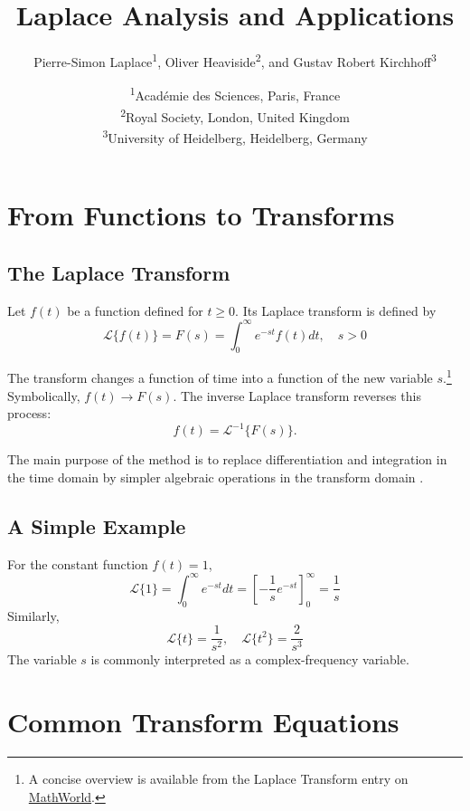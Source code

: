 \documentclass[11pt,a4paper]{article}
\title{Laplace Analysis and Applications}
\author{
    Pierre-Simon Laplace\textsuperscript{1}, 
    Oliver Heaviside\textsuperscript{2}, and 
    Gustav Robert Kirchhoff\textsuperscript{3}
}
\date{
    \small
    \textsuperscript{1}Académie des Sciences, Paris, France \\
    \textsuperscript{2}Royal Society, London, United Kingdom \\
    \textsuperscript{3}University of Heidelberg, Heidelberg, Germany
}
\begin{document}
\maketitle

\section{From Functions to Transforms}

\subsection{The Laplace Transform}

Let $f(t)$ be a function defined for $t \ge 0$. Its Laplace transform is defined by
\begin{equation}
    \mathcal{L}\{f(t)\} = F(s) = \int_{0}^{\infty} e^{-st}f(t)dt, \quad s>0 \label{eq:laplace_def}
\end{equation}

The transform changes a function of time into a function of the new variable $s$.\footnote{A concise overview is available from the Laplace Transform entry on \href{https://mathworld.wolfram.com/LaplaceTransform.html}{MathWorld}.} Symbolically, $f(t) \rightarrow F(s)$. The inverse Laplace transform reverses this process:
\begin{equation}
    f(t) = \mathcal{L}^{-1}\{F(s)\}.
\end{equation}

The main purpose of the method is to replace differentiation and integration in the time domain by simpler algebraic operations in the transform domain \cite{kreyszig}. 

\subsection{A Simple Example}

For the constant function $f(t)=1$, 
\begin{equation}
    \mathcal{L}\{1\} = \int_{0}^{\infty} e^{-st}dt = \left[ -\frac{1}{s}e^{-st} \right]_{0}^{\infty} = \frac{1}{s}
\end{equation}
Similarly,
\begin{equation}
    \mathcal{L}\{t\} = \frac{1}{s^{2}}, \quad \mathcal{L}\{t^{2}\} = \frac{2}{s^{3}}
\end{equation}
The variable $s$ is commonly interpreted as a complex-frequency variable.

\section{Common Transform Equations}
\end{document}
